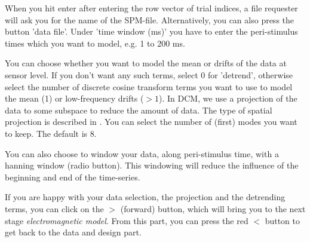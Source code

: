 When you hit enter after entering the
row vector of trial indices, a file requester will ask you for the
name of the SPM-file. Alternatively, you can also press the button
'data file'. Under 'time window (ms)' you have to enter the
peri-stimulus times which you want to model, e.g. 1 to 200 ms. 

You can choose whether you want to model the mean or
drifts of the data at sensor level. If you don't want any such terms,
select 0 for 'detrend', otherwise select the number of discrete cosine
transform terms you want to use to model the mean (1) or low-frequency
drifts ($> 1$). In DCM, we use a projection of the data to some
subspace to reduce the amount of data. The type of spatial projection
is described in \cite{matthias_dcm_constraints}. You can select the
number of (first) modes you want to keep. The default is 8.

You can also choose to window your data, along peri-stimulus time,
with a hanning window (radio button). This windowing will reduce the
influence of the beginning and end of the time-series. 

If you are happy with your data selection, the projection and the detrending
terms, you can click on the $>$ (forward) button, which will bring you to
the next stage \textit{electromagnetic model}. From this part, you can
press the red $<$ button to get back to the data and design part.

